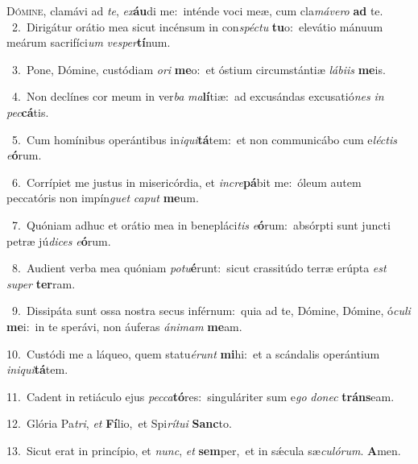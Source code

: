 \lettrine{\initial\textcolor{\initialcolor}{D}}{ómine,} clamávi ad \textit{te}\-, \textit{ex}\-\textbf{áu}di me:~\star inténde voci meæ, cum cla\-\textit{má}\-\textit{ve}\textit{ro} \textbf{ad} te.\\
{\numbfont\textcolor{\numbcolor}{~2.}}~Dirigátur orátio mea sicut incénsum in con\-\textit{spéc}\-\textit{tu} \textbf{tu}\-o:~\star elevátio mánuum meárum sacrifíci\textit{um} \textit{ves}\-\textit{per}\textbf{tí}num.\par
{\numbfont\textcolor{\numbcolor}{~3.}}~Pone, Dómine, custódiam \textit{o}\-\textit{ri} \textbf{me}\-o:~\star et óstium circumstántiæ \textit{lá}\-\textit{bi}\textit{is} \textbf{me}\-is.\par
{\numbfont\textcolor{\numbcolor}{~4.}}~Non declínes cor meum in ver\textit{ba} \textit{ma}\-\textbf{lí}tiæ:~\star ad excusándas excusatió\textit{nes} \textit{in} \textit{pec}\-\textbf{cá}tis.\par
{\numbfont\textcolor{\numbcolor}{~5.}}~Cum homínibus operántibus in\-\textit{i}\-\textit{qui}\textbf{tá}tem:~\star et non communicábo cum e\-\textit{léc}\-\textit{tis} \textit{e}\-\textbf{ó}rum.\par
{\numbfont\textcolor{\numbcolor}{~6.}}~Corrípiet me justus in misericórdia, et \textit{in}\-\textit{cre}\textbf{pá}bit me:~\star óleum autem peccatóris non impín\textit{guet} \textit{ca}\-\textit{put} \textbf{me}\-um.\par
{\numbfont\textcolor{\numbcolor}{~7.}}~Quóniam adhuc et orátio mea in benepláci\textit{tis} \textit{e}\-\textbf{ó}rum:~\star absórpti sunt juncti petræ jú\-\textit{di}\-\textit{ces} \textit{e}\-\textbf{ó}rum.\par
{\numbfont\textcolor{\numbcolor}{~8.}}~Audient verba mea quóniam \textit{pot}\-\textit{u}\textbf{é}runt:~\star sicut crassitúdo terræ erúpta \textit{est} \textit{su}\-\textit{per} \textbf{ter}\-ram.\par
{\numbfont\textcolor{\numbcolor}{~9.}}~Dissipáta sunt ossa nostra secus inférnum:~\dagger quia ad te, Dómine, Dómine, ó\-\textit{cu}\-\textit{li} \textbf{me}\-i:~\star in te sperávi, non áuferas \textit{á}\-\textit{ni}\textit{mam} \textbf{me}\-am.\par
{\numbfont\textcolor{\numbcolor}{10.}}~Custódi me a láqueo, quem statu\-\textit{é}\-\textit{runt} \textbf{mi}\-hi:~\star et a scándalis operántium \textit{in}\-\textit{i}\textit{qui}\textbf{tá}tem.\par
{\numbfont\textcolor{\numbcolor}{11.}}~Cadent in retiáculo ejus \textit{pec}\-\textit{ca}\textbf{tó}res:~\star singuláriter sum e\textit{go} \textit{do}\-\textit{nec} \textbf{tráns}\-eam.\par
{\numbfont\textcolor{\numbcolor}{12.}}~Glória Pa\-\textit{tri}\-, \textit{et} \textbf{Fí}\-lio,~\star et Spi\-\textit{rí}\-\textit{tu}\textit{i} \textbf{Sanc}\-to.\par
{\numbfont\textcolor{\numbcolor}{13.}}~Sicut erat in princípio, et \textit{nunc}\-, \textit{et} \textbf{sem}\-per,~\star et in sǽcula sæ\-\textit{cu}\-\textit{ló}\textit{rum}. \textbf{A}\-men.\par
